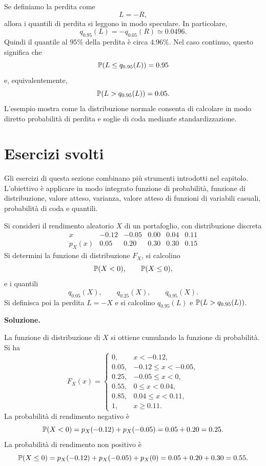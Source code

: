 \begin{example}
Se definiamo la perdita come
\[
L=-R,
\]
allora i quantili di perdita si leggono in modo speculare. In particolare,
\[
q_{0.95}(L)
=
-q_{0.05}(R)
\simeq
0.0496.
\]
Quindi il quantile al $95\%$ della perdita \`{e} circa $4.96\%$. Nel caso
continuo, questo significa che
\[
\mathbb{P}(L\leq q_{0.95}(L))=0.95
\]
e, equivalentemente,
\[
\mathbb{P}(L>q_{0.95}(L))=0.05.
\]
L'esempio mostra come la distribuzione normale consenta di calcolare in modo
diretto probabilit\`{a} di perdita e soglie di coda mediante standardizzazione.
\end{example}


\section{Esercizi svolti}
\label{sec:cap2-esercizi-svolti}

Gli esercizi di questa sezione combinano pi\`{u} strumenti introdotti nel
capitolo. L'obiettivo \`{e} applicare in modo integrato funzione di
probabilit\`{a}, funzione di distribuzione, valore atteso, varianza, valore
atteso di funzioni di variabili casuali, probabilit\`{a} di coda e quantili.

\begin{exercise}
\label{ex:cap2-rendimento-discreto-cdf-quantili}
\par\smallskip

Si consideri il rendimento aleatorio $X$ di un portafoglio, con distribuzione
discreta
\[
\begin{array}{c|ccccc}
x & -0.12 & -0.05 & 0.00 & 0.04 & 0.11\\
\hline
p_X(x) & 0.05 & 0.20 & 0.30 & 0.30 & 0.15
\end{array}
\]
Si determini la funzione di distribuzione $F_X$, si calcolino
\[
\mathbb{P}(X<0),
\qquad
\mathbb{P}(X\leq 0),
\]
e i quantili
\[
q_{0.05}(X),
\qquad
q_{0.25}(X),
\qquad
q_{0.95}(X).
\]
Si definisca poi la perdita $L=-X$ e si calcolino $q_{0.95}(L)$ e
$\mathbb{P}(L>q_{0.95}(L))$.

\end{exercise}

\noindent
\textbf{Soluzione.}

La funzione di distribuzione di $X$ si ottiene cumulando la funzione di
probabilit\`{a}. Si ha
\[
F_X(x)=
\begin{cases}
0, & x<-0.12,\\
0.05, & -0.12\leq x<-0.05,\\
0.25, & -0.05\leq x<0,\\
0.55, & 0\leq x<0.04,\\
0.85, & 0.04\leq x<0.11,\\
1, & x\geq 0.11.
\end{cases}
\]
La probabilit\`{a} di rendimento negativo \`{e}
\[
\mathbb{P}(X<0)
=
p_X(-0.12)+p_X(-0.05)
=
0.05+0.20
=
0.25.
\]
La probabilit\`{a} di rendimento non positivo \`{e}
\[
\mathbb{P}(X\leq 0)
=
p_X(-0.12)+p_X(-0.05)+p_X(0)
=
0.05+0.20+0.30
=
0.55.
\]

